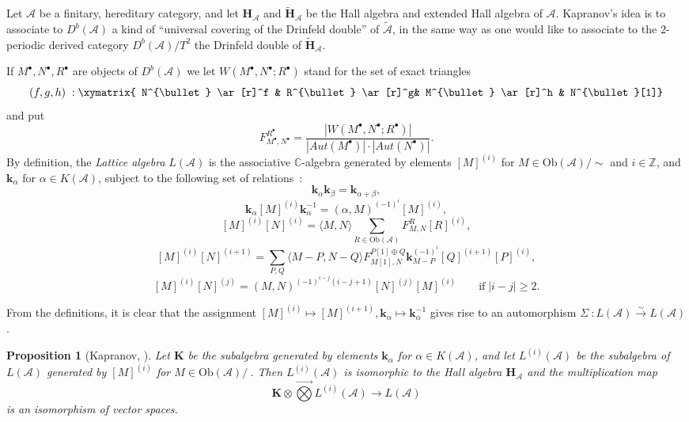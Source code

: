 \documentclass[a4paper,10pt]{amsart}
\def\Z{\mathbb{Z}}
\def\H{\mathbf{H}}
\def\a{\alpha}
\def\b{\beta}
\def\C{\mathbb{C}}
\def\A{\mathcal{A}}
\newtheorem{prop}[theo]{Proposition}
\numberwithin{equation}{section}
\begin{document}
{\vspace{.2in}

Let $\A$ be a finitary, hereditary category, and let $\H_{\A}$ and $\widetilde{\H}_{\A}$ be the Hall algebra and extended Hall algebra of $\A$. Kapranov's idea is to associate to $D^b(\A)$ a kind of ``universal covering of the Drinfeld double'' of $\widetilde{\A}$, in the same way as one would like to associate to the $2$-periodic derived category $D^b(\A)/T^2$ the Drinfeld double of $\widetilde{\H}_{\A}$.

If $M^{\bullet},N^\bullet,R^{\bullet}$ are objects of $D^b(\A)$ we let $W(M^{\bullet},N^{\bullet}; R^{\bullet})$ stand for the set of exact triangles
$$(f,g,h)\;: \xymatrix{ N^{\bullet} \ar[r]^f & R^{\bullet} \ar[r]^g& M^{\bullet} \ar[r]^h & N^{\bullet}[1]}$$
and put
$$F_{M^{\bullet},N^{\bullet}}^{R^{\bullet}}=\frac{|W(M^{\bullet},N^{\bullet};R^{\bullet})|}{|{Aut}(M^{\bullet})| \cdot |{Aut}(N^{\bullet})|}.$$
By definition, the \textit{Lattice algebra} $L(\A)$ is the associative $\C$-algebra generated by elements
$[M]^{(i)}$ for $M \in \text{Ob}(\A)/\sim$ and $i \in \Z$, and $\mathbf{k}_{\a}$ for $\a \in K(\A)$, subject to the following set of relations~:
$$\mathbf{k}_{\a}\mathbf{k}_{\b}=\mathbf{k}_{\a+\b},$$
$$\mathbf{k}_{\a} [M]^{(i)}\mathbf{k}_{\a}^{-1} =(\a,M)^{(-1)^i}[M]^{(i)},$$
$$[M]^{(i)}[N]^{(i)}=\langle M,N\rangle \sum_{R \in \text{Ob}(\A)} F_{M,N}^R [R]^{(i)},$$
$$[M]^{(i)}[N]^{(i+1)}=\sum_{P,Q} \langle M-P,N-Q\rangle F_{M[1],N}^{P[1]\oplus Q} \mathbf{k}_{M-P}^{(-1)^i}[Q]^{(i+1)}[P]^{(i)},$$
$$[M]^{(i)}[N]^{(j)}=(M,N)^{(-1)^{i-j}(i-j+1)}[N]^{(j)}[M]^{(i)}\qquad \text{if}\; |i-j| \geq 2.$$

From the definitions, it is clear that the assignment $[M]^{(i)} \mapsto [M]^{(i+1)}, \mathbf{k}_{\a} \mapsto \mathbf{k}_{\a}^{-1}$ gives rise to an automorphism $\Sigma~: L(\A) \stackrel{\sim}{\to} L(\A)$.

\vspace{.1in}

\begin{prop}[Kapranov, \cite{Kap2}] Let $\mathbf{K}$ be the subalgebra generated by elements $\mathbf{k}_{\a}$ for $\a \in K(\A)$, and let $L^{(i)}(\A)$ be the subalgebra of $L(\A)$ generated by $[M]^{(i)}$ for $M \in \text{Ob}(\A)/~$. Then $L^{(i)}(\A)$ is isomorphic to the Hall algebra $\H_{\A}$ and the multiplication map
$$\mathbf{K} \otimes \vec{\bigotimes} L^{(i)}(\A) \to L(\A)$$
is an isomorphism of vector spaces.
\end{prop}

}
\end{document}
